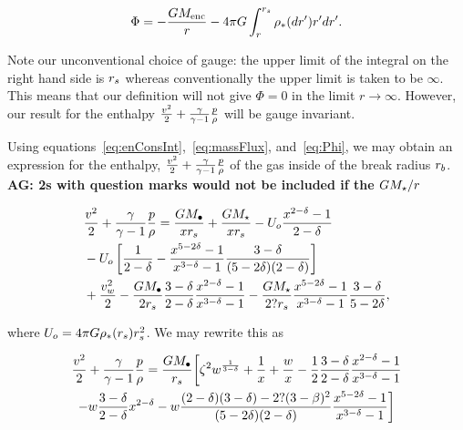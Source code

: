 \begin{align}
\Phi= -\frac{G M_{\rm enc}}{r} - 4 \pi G \int_{r}^{r_s} \rho_*(dr') r'
dr'.
\label{eq:Phi}
\end{align}

Note our unconventional choice of gauge: the upper limit of the
integral on the right hand side is $r_s$ whereas conventionally the
upper limit is taken to be $\infty$. This means that our definition
will not give $\Phi=0$ in the limit $r\rightarrow\infty$. However,
our result for the enthalpy $\frac{v^2}{2} + \frac{\gamma}{\gamma-1} \frac{p}{\rho}$ will be
gauge invariant. 

Using equations~\eqref{eq:enConsInt},~\eqref{eq:massFlux},
and~\eqref{eq:Phi}, we may obtain an expression for the enthalpy,
$\frac{v^2}{2}+\frac{\gamma}{\gamma-1} \frac{p}{\rho}$ of the gas inside of the break radius
$r_b$. {\bf AG: 2s with question marks would not be included if the $G
M_{\star}/r$ }

\begin{align}
&\frac{v^2}{2}+\frac{\gamma}{\gamma-1} \frac{p}{\rho} = \frac{G M_{\bullet}}{x r_s} + \frac{G
  M_\star}{x r_s} - U_o \frac{x^{2-\delta}-1}{2-\delta}\nonumber\\
&-U_o\left[\frac{1}{2-\delta}-\frac{x^{5-2\delta}-1}{x^{3-\delta}-1}\frac{3-\delta}{(5-2\delta)(2-\delta)}\right]\nonumber\\
&+\frac{v_w^2}{2}-\frac{G M_{\bullet}}{2 r_s} \frac{3-\delta}{2-\delta}\frac{x^{2-\delta}-1}{x^{3-\delta}-1} -\frac{G M_\star}{2? r_s} \frac{x^{5-2\delta}-1}{x^{3-\delta}-1}\frac{3-\delta}{5-2\delta},
\end{align}

where $U_o=4 \pi G \rho_*(r_s) r_s^2$.  We may rewrite this as 

\begin{multline}
  \frac{v^2}{2}+\frac{\gamma}{\gamma-1} \frac{p}{\rho}
=\frac{G M_{\bullet}}{r_s} 
\biggl[
  \zeta^2 w^{\frac{1}{3 -\delta}}+\frac{1}{x}+\frac{w}{x}
  -\frac{1}{2} \frac{3-\delta}{2-\delta} \frac{x^{2  -\delta}-1}{x^{3-\delta}-1}\\
  -w \frac{3 -\delta}{2 -\delta} x^{2 -\delta}
  -w \frac{(2-\delta)(3-\delta)-2?(3-\beta)^{2}}{(5-2\delta)(2-\delta)} \frac{x^{5-2\delta}-1}{x^{3-\delta}-1}
\biggr]
\end{multline}
